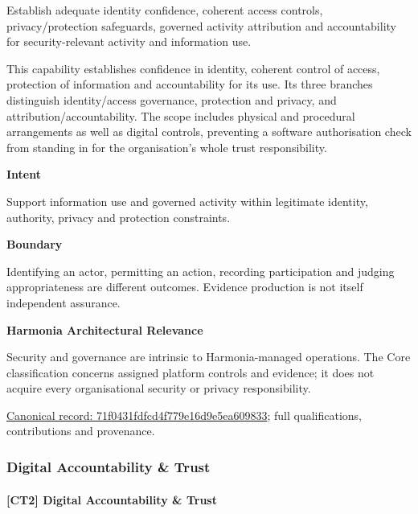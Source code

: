 Establish adequate identity confidence, coherent access controls, privacy/protection safeguards, governed activity attribution and accountability for security-relevant activity and information use.



This capability establishes confidence in identity, coherent control of access, protection of information and accountability for its use. Its three branches distinguish identity/access governance, protection and privacy, and attribution/accountability. The scope includes physical and procedural arrangements as well as digital controls, preventing a software authorisation check from standing in for the organisation's whole trust responsibility.



\textbf{Intent}



Support information use and governed activity within legitimate identity, authority, privacy and protection constraints.



\textbf{Boundary}



Identifying an actor, permitting an action, recording participation and judging appropriateness are different outcomes. Evidence production is not itself independent assurance.



\textbf{Harmonia Architectural Relevance}



Security and governance are intrinsic to Harmonia-managed operations. The Core classification concerns assigned platform controls and evidence; it does not acquire every organisational security or privacy responsibility.


{\footnotesize \href{../../../../continuum/strategy/capability/71f0431fdfcd4f779e16d9e5ea609833.md}{Canonical record: 71f0431fdfcd4f779e16d9e5ea609833}; full qualifications, contributions and provenance.}\par
\subsubsection{Digital Accountability \& Trust}

\paragraph{[CT2] Digital Accountability \& Trust}

